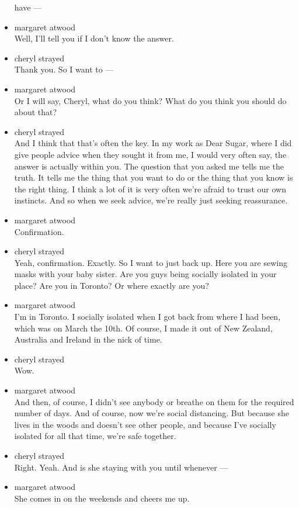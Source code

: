 \begin{itemize}
  have ---
\item
  margaret atwood\\
  Well, I'll tell you if I don't know the answer.
\item
  cheryl strayed\\
  Thank you. So I want to ---
\item
  margaret atwood\\
  Or I will say, Cheryl, what do you think? What do you think you should
  do about that?
\item
  cheryl strayed\\
  And I think that that's often the key. In my work as Dear Sugar, where
  I did give people advice when they sought it from me, I would very
  often say, the answer is actually within you. The question that you
  asked me tells me the truth. It tells me the thing that you want to do
  or the thing that you know is the right thing. I think a lot of it is
  very often we're afraid to trust our own instincts. And so when we
  seek advice, we're really just seeking reassurance.
\item
  margaret atwood\\
  Confirmation.
\item
  cheryl strayed\\
  Yeah, confirmation. Exactly. So I want to just back up. Here you are
  sewing masks with your baby sister. Are you guys being socially
  isolated in your place? Are you in Toronto? Or where exactly are you?
\item
  margaret atwood\\
  I'm in Toronto. I socially isolated when I got back from where I had
  been, which was on March the 10th. Of course, I made it out of New
  Zealand, Australia and Ireland in the nick of time.
\item
  cheryl strayed\\
  Wow.
\item
  margaret atwood\\
  And then, of course, I didn't see anybody or breathe on them for the
  required number of days. And of course, now we're social distancing.
  But because she lives in the woods and doesn't see other people, and
  because I've socially isolated for all that time, we're safe together.
\item
  cheryl strayed\\
  Right. Yeah. And is she staying with you until whenever ---
\item
  margaret atwood\\
  She comes in on the weekends and cheers me up.

\end{itemize}
